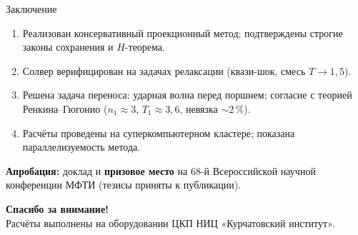 \documentclass[aspectratio=169]{beamer}
\begin{document}
\begin{frame}{Заключение}
  \begin{enumerate}
    \item Реализован консервативный проекционный метод; подтверждены строгие законы
          сохранения и $H$-теорема.
    \item Солвер верифицирован на задачах релаксации (квази-шок, смесь $T\to1{,}5$).
    \item Решена задача переноса: ударная волна перед поршнем; согласие с теорией
          Ренкина--Гюгонио ($n_1\approx3$, $T_1\approx3{,}6$, невязка $\sim2\,\%$).
    \item Расчёты проведены на суперкомпьютерном кластере; показана параллелизуемость метода.
  \end{enumerate}
  \vfill
  {\small \textbf{Апробация:} доклад и \textbf{призовое место} на 68-й Всероссийской научной
  конференции МФТИ (тезисы приняты к публикации).}
\end{frame}

\begin{frame}[plain]
  \centering
  \vfill
  {\Huge \textbf{Спасибо за внимание!}}\\[6mm]
  {\small Расчёты выполнены на оборудовании ЦКП НИЦ «Курчатовский институт».}
  \vfill
\end{frame}
\end{document}
